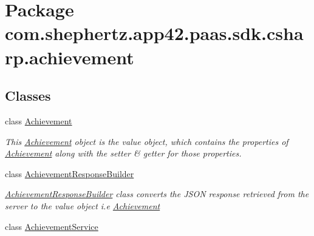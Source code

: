 \hypertarget{namespacecom_1_1shephertz_1_1app42_1_1paas_1_1sdk_1_1csharp_1_1achievement}{\section{Package com.\+shephertz.\+app42.\+paas.\+sdk.\+csharp.\+achievement}
\label{namespacecom_1_1shephertz_1_1app42_1_1paas_1_1sdk_1_1csharp_1_1achievement}
}
\subsection*{Classes}
\begin{DoxyCompactItemize}
\item 
class \hyperlink{classcom_1_1shephertz_1_1app42_1_1paas_1_1sdk_1_1csharp_1_1achievement_1_1_achievement}{Achievement}
\begin{DoxyCompactList}\small\item\em This \hyperlink{classcom_1_1shephertz_1_1app42_1_1paas_1_1sdk_1_1csharp_1_1achievement_1_1_achievement}{Achievement} object is the value object, which contains the properties of \hyperlink{classcom_1_1shephertz_1_1app42_1_1paas_1_1sdk_1_1csharp_1_1achievement_1_1_achievement}{Achievement} along with the setter \& getter for those properties. \end{DoxyCompactList}\item 
class \hyperlink{classcom_1_1shephertz_1_1app42_1_1paas_1_1sdk_1_1csharp_1_1achievement_1_1_achievement_response_builder}{Achievement\+Response\+Builder}
\begin{DoxyCompactList}\small\item\em \hyperlink{classcom_1_1shephertz_1_1app42_1_1paas_1_1sdk_1_1csharp_1_1achievement_1_1_achievement_response_builder}{Achievement\+Response\+Builder} class converts the J\+S\+O\+N response retrieved from the server to the value object i.\+e \hyperlink{classcom_1_1shephertz_1_1app42_1_1paas_1_1sdk_1_1csharp_1_1achievement_1_1_achievement}{Achievement} \end{DoxyCompactList}\item 
class \hyperlink{classcom_1_1shephertz_1_1app42_1_1paas_1_1sdk_1_1csharp_1_1achievement_1_1_achievement_service}{Achievement\+Service}
\end{DoxyCompactItemize}
